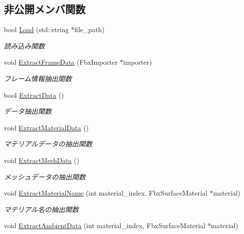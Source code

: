 \subsection*{非公開メンバ関数}
\begin{DoxyCompactItemize}
\item 
bool \mbox{\hyperlink{class_fbx_converter_a5259c5ec8f57b412455d75ccebb27524}{Load}} (std\+::string $\ast$file\+\_\+path)
\begin{DoxyCompactList}\small\item\em 読み込み関数 \end{DoxyCompactList}\item 
void \mbox{\hyperlink{class_fbx_converter_a0f6070933510e57b4a781d97d46f7406}{Extract\+Frame\+Data}} (Fbx\+Importer $\ast$importer)
\begin{DoxyCompactList}\small\item\em フレーム情報抽出関数 \end{DoxyCompactList}\item 
bool \mbox{\hyperlink{class_fbx_converter_ab0e56fde4c4e0f5bc846e7a6cd7f8a19}{Extract\+Data}} ()
\begin{DoxyCompactList}\small\item\em データ抽出関数 \end{DoxyCompactList}\item 
void \mbox{\hyperlink{class_fbx_converter_accf269065c211ffb8fc77634bf8dbee9}{Extract\+Material\+Data}} ()
\begin{DoxyCompactList}\small\item\em マテリアルデータの抽出関数 \end{DoxyCompactList}\item 
void \mbox{\hyperlink{class_fbx_converter_a4e1c69b9948c7aa9659a80ba3ba85f9f}{Extract\+Mesh\+Data}} ()
\begin{DoxyCompactList}\small\item\em メッシュデータの抽出関数 \end{DoxyCompactList}\item 
void \mbox{\hyperlink{class_fbx_converter_ae0180e652e003309edeb721f6d88e378}{Extract\+Material\+Name}} (int material\+\_\+index, Fbx\+Surface\+Material $\ast$material)
\begin{DoxyCompactList}\small\item\em マテリアル名の抽出関数 \end{DoxyCompactList}\item 
void \mbox{\hyperlink{class_fbx_converter_a95cb085115d7832311264e9d27b5fb72}{Extract\+Ambient\+Data}} (int material\+\_\+index, Fbx\+Surface\+Material $\ast$material)

\end{DoxyCompactItemize}
